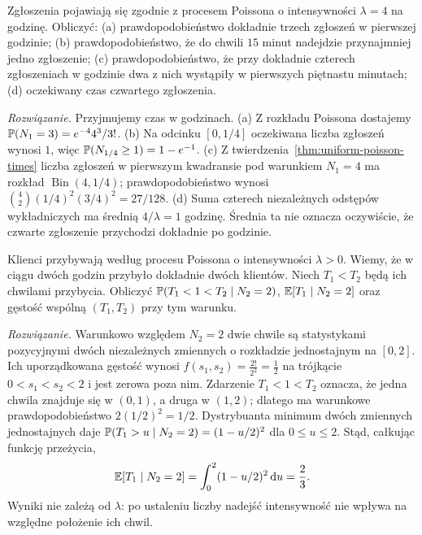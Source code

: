 \begin{zadanie}
Zgłoszenia pojawiają się zgodnie z procesem Poissona o
intensywności $\lambda=4$ na godzinę. Obliczyć: (a)
prawdopodobieństwo dokładnie trzech zgłoszeń w pierwszej godzinie;
(b) prawdopodobieństwo, że do chwili $15$ minut nadejdzie
przynajmniej jedno zgłoszenie; (c) prawdopodobieństwo,
że przy dokładnie czterech zgłoszeniach w godzinie dwa z nich
wystąpiły w pierwszych piętnastu minutach;
(d) oczekiwany czas czwartego zgłoszenia.

\emph{Rozwiązanie.} Przyjmujemy czas w godzinach.
(a) Z rozkładu Poissona dostajemy
$\mathbb{P}(N_1=3)=e^{-4}4^3/3!$.
(b) Na odcinku $[0,1/4]$ oczekiwana liczba zgłoszeń wynosi
$1$, więc $\mathbb{P}(N_{1/4}\ge1)=1-e^{-1}$.
(c) Z twierdzenia~\ref{thm:uniform-poisson-times} liczba
zgłoszeń w pierwszym kwadransie pod warunkiem $N_1=4$
ma rozkład $\operatorname{Bin}(4,1/4)$; prawdopodobieństwo
wynosi $\binom42(1/4)^2(3/4)^2=27/128$.
(d) Suma czterech niezależnych odstępów wykładniczych ma średnią
$4/\lambda=1$ godzinę. Średnia ta nie oznacza oczywiście, że
czwarte zgłoszenie przychodzi dokładnie po godzinie.
\end{zadanie}


\begin{zadanie}
Klienci przybywają według procesu Poissona o intensywności
$\lambda>0$. Wiemy, że w ciągu dwóch godzin przybyło dokładnie
dwóch klientów. Niech $T_1<T_2$ będą ich chwilami przybycia.
Obliczyć $\mathbb{P}(T_1<1<T_2\mid N_2=2)$,
$\mathbb{E}[T_1\mid N_2=2]$ oraz gęstość wspólną $(T_1,T_2)$
przy tym warunku.

\emph{Rozwiązanie.} Warunkowo względem $N_2=2$
dwie chwile są statystykami pozycyjnymi dwóch niezależnych
zmiennych o rozkładzie jednostajnym na $[0,2]$.
Ich uporządkowana gęstość wynosi
$f(s_1,s_2)=\frac{2!}{2^2}=\frac12$ na trójkącie
$0<s_1<s_2<2$ i jest zerowa poza nim. Zdarzenie
$T_1<1<T_2$ oznacza, że jedna chwila znajduje się
w $(0,1)$, a druga w $(1,2)$; dlatego ma warunkowe
prawdopodobieństwo $2(1/2)^2=1/2$.
Dystrybuanta minimum dwóch zmiennych jednostajnych daje
$\mathbb{P}(T_1>u\mid N_2=2)=(1-u/2)^2$ dla $0\le u\le2$.
Stąd, całkując funkcję przeżycia,
\[
\mathbb{E}[T_1\mid N_2=2]
=\int_0^2(1-u/2)^2\,\mathrm{d} u=\frac23.
\]
Wyniki nie zależą od $\lambda$: po ustaleniu liczby nadejść
intensywność nie wpływa na względne położenie ich chwil.
\end{zadanie}

